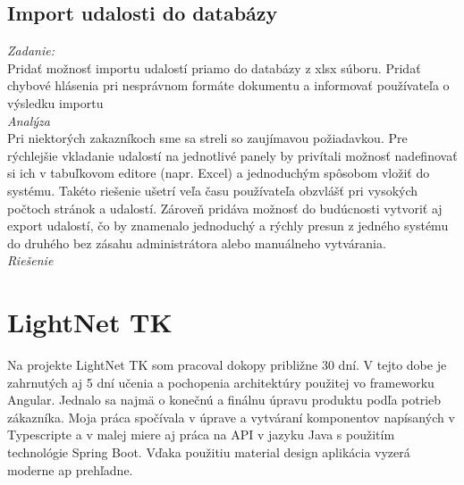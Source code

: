 \documentclass[11pt, oneside]{report}
\begin{document}
\subsection*{Import udalosti do databázy}
\textit{Zadanie:}\\
Pridať možnosť importu udalostí priamo do databázy z xlsx súboru. Pridať  chybové hlásenia pri  nesprávnom formáte dokumentu a informovať používateľa o výsledku importu
\\\textit{Analýza}\\
Pri niektorých zakazníkoch sme sa streli so zaujímavou požiadavkou. Pre rýchlejšie vkladanie  udalostí na jednotlivé panely by privítali možnosť nadefinovať si ich   v tabuľkovom editore (napr. Excel) a jednoduchým spôsobom vložiť do systému. Takéto riešenie ušetrí veľa času používateľa obzvlášť pri vysokých počtoch stránok a udalostí. Zároveň pridáva možnosť  do budúcnosti vytvoriť aj export udalostí, čo by znamenalo  jednoduchý a rýchly presun z jedného systému do druhého bez zásahu administrátora alebo manuálneho vytvárania.
\\\textit{Riešenie}\\
\section{LightNet TK}
Na projekte LightNet TK som pracoval dokopy približne  30 dní. V tejto dobe  je zahrnutých aj 5 dní učenia  a pochopenia architektúry použitej vo frameworku Angular. Jednalo sa najmä o konečnú a finálnu úpravu produktu podľa potrieb zákazníka. Moja práca spočívala v úprave a vytváraní  komponentov napísaných v Typescripte a v malej miere aj práca na API  v jazyku Java s použitím technológie Spring Boot. Vďaka použitiu material design aplikácia vyzerá moderne ap prehľadne.
\end{document}
